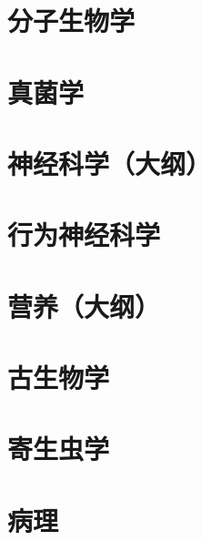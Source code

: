 \documentclass[UTF8]{NatureUniverse}
\begin{document}
\section{分子生物学}
\section{真菌学}
\section{神经科学（大纲）}
\section{行为神经科学}
\section{营养（大纲）}
\section{古生物学}
\section{寄生虫学}
\section{病理}
\end{document}
